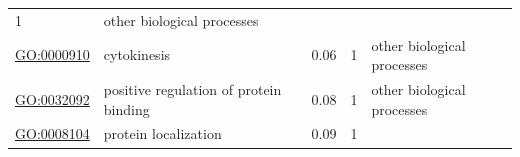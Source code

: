 \documentclass[
]{article}
\begin{document}
\begin{longtable}[]{@{}lllll@{}}
\begin{minipage}[t]{0.17\columnwidth}
1\strut
\end{minipage} & \begin{minipage}[t]{0.17\columnwidth}\raggedright
other biological processes\strut
\end{minipage}\tabularnewline
\begin{minipage}[t]{0.17\columnwidth}\raggedright
\url{GO:0000910}\strut
\end{minipage} & \begin{minipage}[t]{0.17\columnwidth}\raggedright
cytokinesis\strut
\end{minipage} & \begin{minipage}[t]{0.17\columnwidth}\raggedright
0.06\strut
\end{minipage} & \begin{minipage}[t]{0.17\columnwidth}\raggedright
1\strut
\end{minipage} & \begin{minipage}[t]{0.17\columnwidth}\raggedright
other biological processes\strut
\end{minipage}\tabularnewline
\begin{minipage}[t]{0.17\columnwidth}\raggedright
\url{GO:0032092}\strut
\end{minipage} & \begin{minipage}[t]{0.17\columnwidth}\raggedright
positive regulation of protein binding\strut
\end{minipage} & \begin{minipage}[t]{0.17\columnwidth}\raggedright
0.08\strut
\end{minipage} & \begin{minipage}[t]{0.17\columnwidth}\raggedright
1\strut
\end{minipage} & \begin{minipage}[t]{0.17\columnwidth}\raggedright
other biological processes\strut
\end{minipage}\tabularnewline
\begin{minipage}[t]{0.17\columnwidth}\raggedright
\url{GO:0008104}\strut
\end{minipage} & \begin{minipage}[t]{0.17\columnwidth}\raggedright
protein localization\strut
\end{minipage} & \begin{minipage}[t]{0.17\columnwidth}\raggedright
0.09\strut
\end{minipage} & \begin{minipage}[t]{0.17\columnwidth}\raggedright
1\strut
\end{minipage} & \begin{minipage}[t]{0.17\columnwidth}\raggedright

\end{minipage}
\end{longtable}
\end{document}
